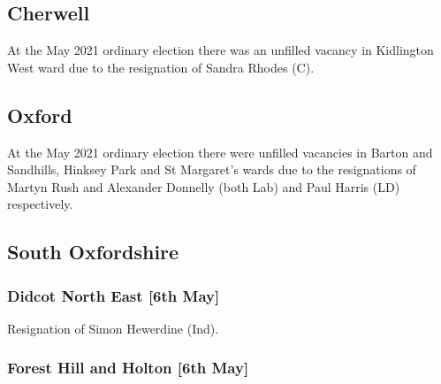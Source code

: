 \documentclass[a4paper,openany]{book}
\begin{document}
\begin{resultsiii}
\subsection*{Cherwell}

At the May 2021 ordinary election there was an unfilled vacancy in Kidlington West ward due to the resignation of Sandra Rhodes (C).

\subsection*{Oxford}


At the May 2021 ordinary election there were unfilled vacancies in Barton and Sandhills, Hinksey Park and St Margaret's wards due to the resignations of Martyn Rush and Alexander Donnelly (both Lab) and Paul Harris (LD) respectively.

\subsection*{South Oxfordshire}

\subsubsection*{Didcot North East \hspace*{\fill}\nolinebreak[1]%
	\enspace\hspace*{\fill}
	[6th May]}


Resignation of Simon Hewerdine (Ind).

\subsubsection*{Forest Hill and Holton \hspace*{\fill}\nolinebreak[1]%
	\enspace\hspace*{\fill}
	[6th May]}



\end{resultsiii}
\end{document}
